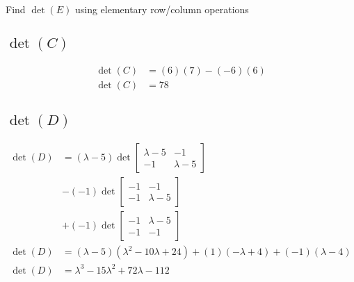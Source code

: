\documentclass{article}
\begin{document}
Find $ \det(E) $ using elementary row/column operations

\subsection{$ \det(C) $}
\begin{align*}
	\det(C) & = (6)(7) - (-6)(6) \\
	\det(C) & = 78
\end{align*}

\subsection{$ \det(D) $}
\begin{align*}
	\det(D) & = 
		(\lambda - 5) \det \begin{bmatrix} \lambda - 5 & -1 \\ -1 & \lambda - 5 \end{bmatrix} \\
		& - (-1) \det \begin{bmatrix} -1 & -1 \\ -1 & \lambda - 5 \end{bmatrix} \\
		& + (-1) \det \begin{bmatrix} -1 & \lambda - 5 \\ -1 & -1 \end{bmatrix} \\
	\det(D) & = (\lambda - 5)(\lambda^2 - 10\lambda + 24) + (1)(-\lambda + 4) + (-1)(\lambda - 4) \\
	\det(D) & = \lambda^3 - 15\lambda^2 + 72\lambda - 112
\end{align*}
\end{document}
